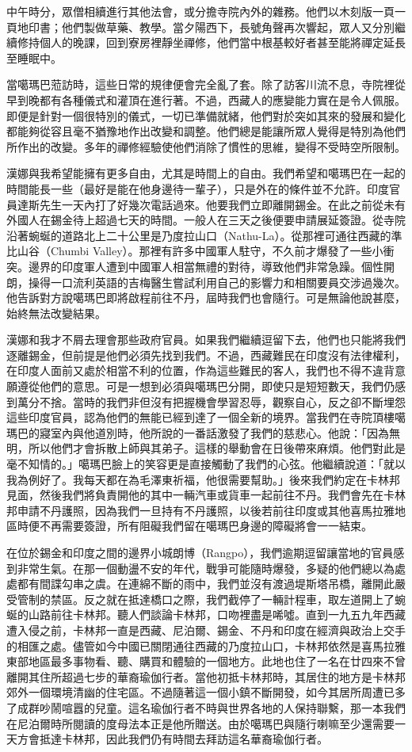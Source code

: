 中午時分，眾僧相續進行其他法會，或分擔寺院內外的雜務。他們以木刻版一頁一頁地印書；他們製做草藥、教學。當夕陽西下，長號角聲再次響起，眾人又分別繼續修持個人的晚課，回到寮房裡靜坐禪修，他們當中根基較好者甚至能將禪定延長至睡眠中。

當噶瑪巴蒞訪時，這些日常的規律便會完全亂了套。除了訪客川流不息，寺院裡從早到晚都有各種儀式和灌頂在進行著。不過，西藏人的應變能力實在是令人佩服。即便是針對一個很特別的儀式，一切已準備就緒，他們對於突如其來的發展和變化都能夠從容且毫不猶豫地作出改變和調整。他們總是能讓所眾人覺得是特別為他們所作出的改變。多年的禪修經驗使他們消除了慣性的思維，變得不受時空所限制。

漢娜與我希望能擁有更多自由，尤其是時間上的自由。我們希望和噶瑪巴在一起的時間能長一些（最好是能在他身邊待一輩子），只是外在的條件並不允許。印度官員達斯先生一天內打了好幾次電話過來。他要我們立即離開錫金。在此之前從未有外國人在錫金待上超過七天的時間。一般人在三天之後便要申請展延簽證。從寺院沿著蜿蜒的道路北上二十公里是乃度拉山口（Nathu-La）。從那裡可通往西藏的準比山谷（Chumbi
Valley）。那裡有許多中國軍人駐守，不久前才爆發了一些小衝突。邊界的印度軍人遭到中國軍人相當無禮的對待，導致他們非常急躁。個性開朗，操得一口流利英語的吉梅醫生嘗試利用自己的影響力和相關要員交涉過幾次。他告訴對方說噶瑪巴即將啟程前往不丹，屆時我們也會隨行。可是無論他說甚麼，始終無法改變結果。

漢娜和我才不屑去理會那些政府官員。如果我們繼續逗留下去，他們也只能將我們逐離錫金，但前提是他們必須先找到我們。不過，西藏難民在印度沒有法律權利，在印度人面前又處於相當不利的位置，作為這些難民的客人，我們也不得不違背意願遵從他們的意思。可是一想到必須與噶瑪巴分開，即使只是短短數天，我們仍感到萬分不捨。當時的我們非但沒有把握機會學習忍辱，觀察自心，反之卻不斷埋怨這些印度官員，認為他們的無能已經到達了一個全新的境界。當我們在寺院頂樓噶瑪巴的寢室內與他道別時，他所說的一番話激發了我們的慈悲心。他說：「因為無明，所以他們才會拆散上師與其弟子。這樣的舉動會在日後帶來麻煩。他們對此是毫不知情的。」噶瑪巴臉上的笑容更是直接觸動了我們的心弦。他繼續說道：「就以我為例好了。我每天都在為毛澤東祈福，他很需要幫助。」後來我們約定在卡林邦見面，然後我們將負責開他的其中一輛汽車或貨車一起前往不丹。我們會先在卡林邦申請不丹護照，因為我們一旦持有不丹護照，以後若前往印度或其他喜馬拉雅地區時便不再需要簽證，所有阻礙我們留在噶瑪巴身邊的障礙將會一一結束。

在位於錫金和印度之間的邊界小城朗博（Rangpo），我們逾期逗留讓當地的官員感到非常生氣。在那一個動盪不安的年代，戰爭可能隨時爆發，多疑的他們總以為處處都有間諜勾串之虞。在連綿不斷的雨中，我們並沒有渡過堤斯塔吊橋，離開此嚴受管制的禁區。反之就在抵達橋口之際，我們截停了一輛計程車，取左道開上了蜿蜒的山路前往卡林邦。聽人們談論卡林邦，口吻裡盡是唏噓。直到一九五九年西藏遭入侵之前，卡林邦一直是西藏、尼泊爾、錫金、不丹和印度在經濟與政治上交手的相匯之處。儘管如今中國已關閉通往西藏的乃度拉山口，卡林邦依然是喜馬拉雅東部地區最多事物看、聽、購買和體驗的一個地方。此地也住了一名在廿四來不曾離開其住所超過七步的華裔瑜伽行者。當他初抵卡林邦時，其居住的地方是卡林邦郊外一個環境清幽的住宅區。不過隨著這一個小鎮不斷開發，如今其居所周遭已多了成群吵鬧喧囂的兒童。這名瑜伽行者不時與世界各地的人保持聯繫，那一本我們在尼泊爾時所閱讀的度母法本正是他所贈送。由於噶瑪巴與隨行喇嘛至少還需要一天方會抵達卡林邦，因此我們仍有時間去拜訪這名華裔瑜伽行者。

